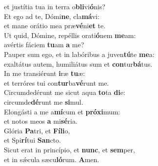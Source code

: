 \oddverse et justítia tua in terra o\textbf{bli}vi\textbf{ó}nis?\\
\evenverse Et ego ad te, Dómi\textbf{ne}, cla\textbf{má}vi:~\*\\
\evenverse et mane orátio mea præ\textbf{vé}ni\textbf{et} te.\\
\oddverse Ut quid, Dómine, repéllis orati\textbf{ó}nem \textbf{me}am:~\*\\
\oddverse avértis fáciem \textbf{tu}am \textbf{a} me?\\
\evenverse Pauper sum ego, et in labóribus a juven\textbf{tú}te \textbf{me}a:~\*\\
\evenverse exaltátus autem, humiliátus sum et \textbf{con}tur\textbf{bá}tus.\\
\oddverse In me transiérunt \textbf{i}ræ \textbf{tu}æ:~\*\\
\oddverse et terróres tui con\textbf{tur}ba\textbf{vé}runt me.\\
\evenverse Circumdedérunt me sicut aqua \textbf{to}ta \textbf{di}e:~\*\\
\evenverse circumde\textbf{dé}runt me \textbf{si}mul.\\
\oddverse Elongásti a me a\textbf{mí}cum et \textbf{pró}\textbf{xi}mum:~\*\\
\oddverse et notos meos \textbf{a} mi\textbf{sé}ria.\\
\evenverse Glória \textbf{Pa}tri, et \textbf{Fí}\textbf{li}o,~\*\\
\evenverse et Spi\textbf{rí}tui \textbf{San}cto.\\
\oddverse Sicut erat in princípio, et \textbf{nunc}, et \textbf{sem}per,~\*\\
\oddverse et in sǽcula sæcu\textbf{ló}rum. \textbf{A}men.\\
